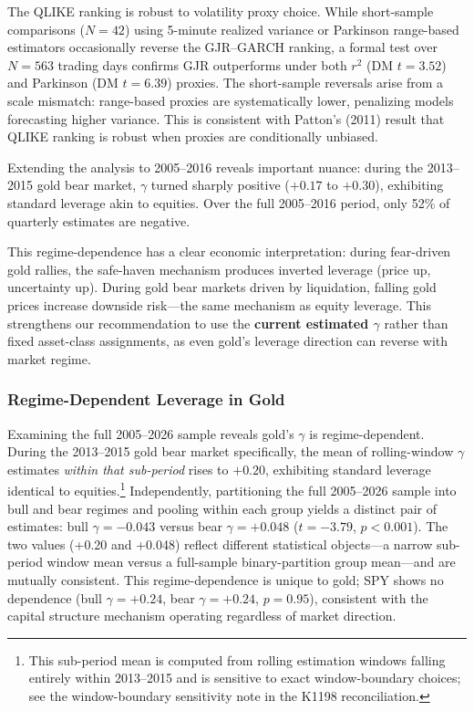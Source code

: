 The QLIKE ranking is robust to volatility proxy choice. While short-sample comparisons ($N = 42$) using 5-minute realized variance or Parkinson range-based estimators occasionally reverse the GJR--GARCH ranking, a formal test over $N = 563$ trading days confirms GJR outperforms under both $r^2$ (DM $t = 3.52$) and Parkinson (DM $t = 6.39$) proxies. The short-sample reversals arise from a scale mismatch: range-based proxies are systematically lower, penalizing models forecasting higher variance. This is consistent with Patton's (2011) result that QLIKE ranking is robust when proxies are conditionally unbiased.

Extending the analysis to 2005--2016 reveals important nuance: during the 2013--2015 gold bear market, $\gamma$ turned sharply positive ($+0.17$ to $+0.30$), exhibiting standard leverage akin to equities. Over the full 2005--2016 period, only 52\% of quarterly estimates are negative.

This regime-dependence has a clear economic interpretation: during fear-driven gold rallies, the safe-haven mechanism produces inverted leverage (price up, uncertainty up). During gold bear markets driven by liquidation, falling gold prices increase downside risk---the same mechanism as equity leverage. This strengthens our recommendation to use the \textbf{current estimated $\gamma$} rather than fixed asset-class assignments, as even gold's leverage direction can reverse with market regime.


\subsubsection{Regime-Dependent Leverage in Gold}

Examining the full 2005--2026 sample reveals gold's $\gamma$ is regime-dependent. During the 2013--2015 gold bear market specifically, the mean of rolling-window $\gamma$ estimates \emph{within that sub-period} rises to $+0.20$, exhibiting standard leverage identical to equities.\footnote{This sub-period mean is computed from rolling estimation windows falling entirely within 2013--2015 and is sensitive to exact window-boundary choices; see the window-boundary sensitivity note in the K1198 reconciliation.} Independently, partitioning the full 2005--2026 sample into bull and bear regimes and pooling within each group yields a distinct pair of estimates: bull $\gamma = -0.043$ versus bear $\gamma = +0.048$ ($t = -3.79$, $p < 0.001$). The two values (+0.20 and +0.048) reflect different statistical objects---a narrow sub-period window mean versus a full-sample binary-partition group mean---and are mutually consistent. This regime-dependence is unique to gold; SPY shows no dependence (bull $\gamma = +0.24$, bear $\gamma = +0.24$, $p = 0.95$), consistent with the capital structure mechanism operating regardless of market direction.

